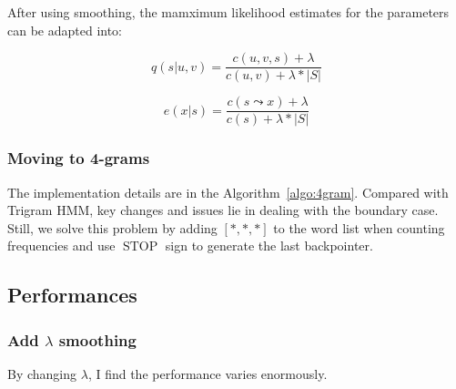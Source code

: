 After using smoothing, the mamximum likelihood estimates for the parameters can be adapted into: 

$$q(s | u, v)=\frac{c(u, v, s) + \lambda}{c(u, v) + \lambda * |S|}$$

$$e(x | s)=\frac{c(s \leadsto x) + \lambda}{c(s) + \lambda*|S|}$$

\subsubsection{\textbf{Moving to 4-grams}}

The implementation details are in the Algorithm~\ref{algo:4gram}. Compared with Trigram HMM, key changes and issues lie in dealing with the boundary case. Still, we solve this problem by adding $[*,*,*]$ to the word list when counting frequencies and use $\operatorname{STOP}$ sign to generate the last backpointer.

\subsection{\textbf{Performances}}

\subsubsection{\textbf{Add $\lambda$ smoothing}}

By changing $\lambda$, I find the performance varies enormously.
    
